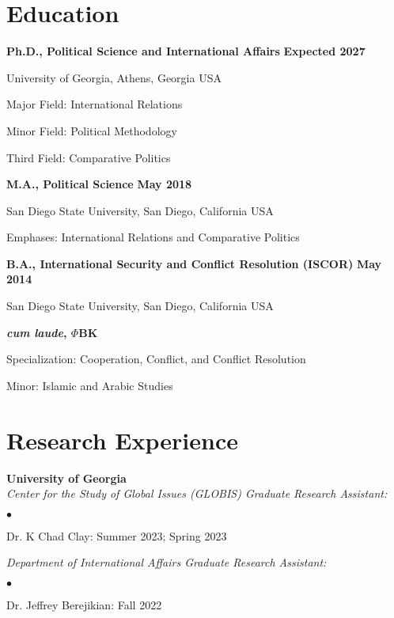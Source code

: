 \documentclass[letterpaper,12pt]{article}
\newenvironment{list1}{
  \begin{list}{}{
      \setlength{\itemsep}{0in}
      \setlength{\parsep}{0in} \setlength{\parskip}{0in}
      \setlength{\topsep}{0in} \setlength{\partopsep}{0in} 
      \setlength{\leftmargin}{0in}}}{\end{list}}
\newenvironment{list2}{
  \begin{list}{$\bullet$}{%
      \setlength{\itemsep}{0in}
      \setlength{\parsep}{0in} \setlength{\parskip}{0in}
      \setlength{\topsep}{0in} \setlength{\partopsep}{0in} 
      \setlength{\leftmargin}{0.5in}}}{\end{list}}
\begin{document}
\section{Education}
{\bf Ph.D., Political Science and International Affairs} \hfill {\bf Expected 2027}
\begin{list1} 
\item University of Georgia, Athens, Georgia USA
\item Major Field: International Relations
\item Minor Field: Political Methodology
\item Third Field: Comparative Politics
\end{list1}
\par
{\bf M.A., Political Science} \hfill {\bf May 2018}
\begin{list1} 
\item San Diego State University, San Diego, California USA
\item Emphases: International Relations and Comparative Politics
\end{list1}
\par
{\bf B.A., International Security and Conflict Resolution (ISCOR)} \hfill {\bf May 2014}
\begin{list1} 
\item San Diego State University, San Diego, California USA
\item \textbf{\textit{cum laude}, $\Phi$BK}
\item Specialization: Cooperation, Conflict, and Conflict Resolution
\item Minor: Islamic and Arabic Studies
\end{list1}

\section{Research Experience}
\textbf{University of Georgia}\\
\textit{Center for the Study of Global Issues (GLOBIS) Graduate Research Assistant:}
\begin{list2}
    \item Dr. K Chad Clay: Summer 2023; Spring 2023
\end{list2}
\par
\textit{Department of International Affairs Graduate Research Assistant:}
\begin{list2}
    \item Dr. Jeffrey Berejikian: Fall 2022
\end{list2}
\end{document}
